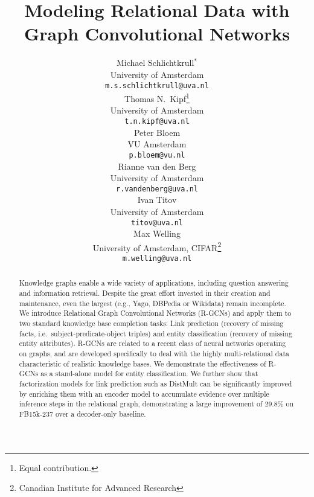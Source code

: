 \documentclass[letterpaper]{article} \usepackage{aaai18}  \usepackage{times}  \usepackage{helvet}  \usepackage{courier}  \usepackage{url}  \usepackage{graphicx}  \frenchspacing
\begin{document}
\title{Modeling Relational Data with Graph Convolutional Networks}

\author{
  Michael Schlichtkrull$^*$\\
  University of Amsterdam\\
  \texttt{m.s.schlichtkrull@uva.nl}\\\And
  Thomas N.~Kipf\thanks{Equal contribution.}\\
  University of Amsterdam\\
  \texttt{t.n.kipf@uva.nl}\\ \And
   Peter Bloem\\
  VU Amsterdam\\
  \texttt{p.bloem@vu.nl}\\ \AND
  Rianne van den Berg\\
  University of Amsterdam\\
  \texttt{r.vandenberg@uva.nl}\\\And
  Ivan Titov\\
  University of Amsterdam\\
  \texttt{titov@uva.nl}\\ \And
  Max Welling\\
  University of Amsterdam, CIFAR\thanks{Canadian Institute for Advanced Research}\\
  \texttt{m.welling@uva.nl}\\
}

\maketitle

\begin{abstract}

Knowledge graphs enable a wide variety of applications, including question answering and information retrieval. Despite the great effort invested in their creation and maintenance, even the largest (e.g., Yago, DBPedia or Wikidata) remain incomplete. We introduce Relational Graph Convolutional Networks (R-GCNs) and apply them to two standard knowledge base completion tasks: Link prediction (recovery of missing facts, i.e.~subject-predicate-object triples) and entity classification (recovery of missing entity attributes). R-GCNs are related to a recent class of neural networks operating on graphs, and are developed specifically to deal with the highly multi-relational data characteristic of realistic knowledge bases. We demonstrate the effectiveness of R-GCNs as a stand-alone model for entity classification. We further show that factorization models for link prediction such as DistMult can be significantly improved by enriching them with an encoder model to accumulate evidence over multiple inference steps in the relational graph, demonstrating a large improvement of 29.8\% on FB15k-237 over a decoder-only baseline.

\end{abstract}
\end{document}
